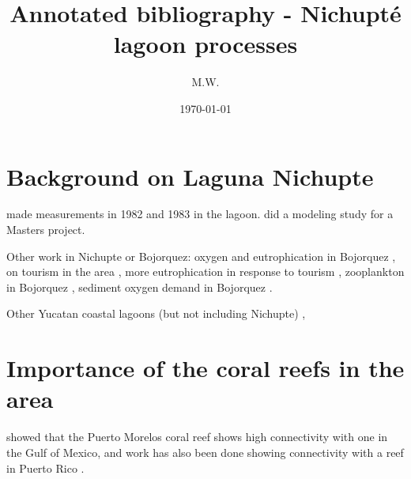 \documentclass[11pt]{article}
\begin{document}
\title{Annotated bibliography - Nichupt{\'e} lagoon processes}
\author{M.W.}
\date{\today}
\maketitle

\section*{Background on Laguna Nichupte}

\citet{merino90} made measurements in 1982 and 1983 in the lagoon. \citet{pedrozoacuna08} did a modeling study for a Masters project. 

Other work in Nichupte or Bojorquez: oxygen and eutrophication in Bojorquez \citep{reyes91}, on tourism in the area \citep{torres05}, more eutrophication in response to tourism \citep{merino92}, zooplankton in Bojorquez \citep{alvarezcadena96}, sediment oxygen demand in Bojorquez \citep{valdeslozano06}.

Other Yucatan coastal lagoons (but not including Nichupte) \citep{herrerasilveria98}, 


\section*{Importance of the coral reefs in the area}

\citet{villegassanchez14} showed that the Puerto Morelos coral reef shows high connectivity with one in the Gulf of Mexico, and work has also been done showing connectivity with a reef in Puerto Rico \citep{labastidaestrada14}.





{}

\end{document}
